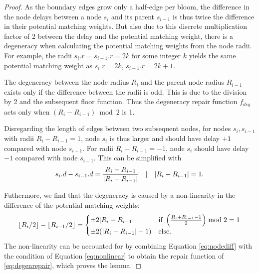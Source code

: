 \begin{proof}
  As the boundary edges grow only a half-edge per bloom, the difference in the node delays between a node $s_i$ and its parent $s_{i-1}$ is thus twice the difference in their potential matching weights. But also due to this discrete multiplication factor of 2 between the delay and the potential matching weight, there is a degeneracy when calculating the potential matching weights from the node radii. For example, the radii $s_i.r = s_{i-1}.r = 2k$ for some integer $k$ yields the same potential matching weight as $s_i.r = 2k$, $s_{i-1}.r = 2k + 1$.

  The degeneracy between the node radius $R_i$ and the parent node radius $R_{i-1}$ exists only if the difference between the radii is odd. This is due to the division by 2 and the subsequent floor function. Thus the degeneracy repair function $f_{deg}$ acts only when $(R_i - R_{i-1}) \bmod 2$ is 1. 
  
  Disregarding the length of edges between two subsequent nodes, for nodes $s_i, s_{i-1}$ with radii $R_i-R_{i-1}=1$, node $s_i$ is thus larger and should have delay $+1$ compared with node $s_{i-1}$. For radii $R_i-R_{i-1}=-1$, node $s_i$ should have delay $-1$ compared with node $s_{i-1}$. This can be simplified with
  \begin{equation}\label{eq:nodediff}
    s_i.d - s_{i-1}.d = \frac{R_i - R_{i-1}}{\abs{R_i - R_{i-1}}} \hspace{1em} | \hspace{1em} \abs{R_i - R_{i-1}} = 1.
  \end{equation}
  
  Futhermore, we find that the degeneracy is caused by a non-linearity in the difference of the potential matching weights:
  \begin{equation}\label{eq:nonlinear}
    {\left \lfloor R_i/2 \right \rfloor }-{\left \lfloor R_{i-1}/2 \right \rfloor } = 
    \begin{cases}
      \pm 2\abs{R_i - R_{i-1}} & \text{if } \left(\frac{R_i+R_{i-1}-1}{2}\right)\bmod 2 = 1 \\
      \pm 2(\abs{R_i - R_{i-1}} - 1) & \text{else}.
    \end{cases}
  \end{equation}
   The non-linearity can be accounted for by combining Equation \eqref{eq:nodediff} with the condition of Equation \eqref{eq:nonlinear} to obtain the repair function of \eqref{eq:degenrepair}, which proves the lemma. 
\end{proof}

